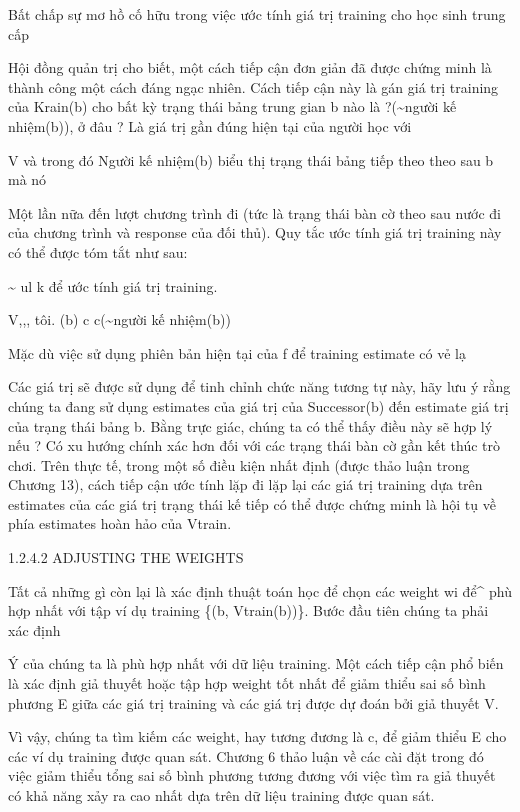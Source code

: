 Bất chấp sự mơ hồ cố hữu trong việc ước tính giá trị training cho học sinh trung cấp

Hội đồng quản trị cho biết, một cách tiếp cận đơn giản đã được chứng minh là thành công một cách đáng ngạc nhiên. Cách tiếp cận này là gán giá trị training của Krain(b) cho bất kỳ trạng thái bảng trung gian b nào là ?(\textasciitilde{}người kế nhiệm(b)), ở đâu ? Là giá trị gần đúng hiện tại của người học với

V và trong đó Người kế nhiệm(b) biểu thị trạng thái bảng tiếp theo theo sau b mà nó

Một lần nữa đến lượt chương trình đi (tức là trạng thái bàn cờ theo sau nước đi của chương trình và response của đối thủ). Quy tắc ước tính giá trị training này có thể được tóm tắt như sau:

\textasciitilde{} ul k để ước tính giá trị training.

V,,, tôi. (b) c c(\textasciitilde{}người kế nhiệm(b))

Mặc dù việc sử dụng phiên bản hiện tại của f để training estimate có vẻ lạ

Các giá trị sẽ được sử dụng để tinh chỉnh chức năng tương tự này, hãy lưu ý rằng chúng ta đang sử dụng estimates của giá trị của Successor(b) đến estimate giá trị của trạng thái bảng b. Bằng trực giác, chúng ta có thể thấy điều này sẽ hợp lý nếu ? Có xu hướng chính xác hơn đối với các trạng thái bàn cờ gần kết thúc trò chơi. Trên thực tế, trong một số điều kiện nhất định (được thảo luận trong Chương 13), cách tiếp cận ước tính lặp đi lặp lại các giá trị training dựa trên estimates của các giá trị trạng thái kế tiếp có thể được chứng minh là hội tụ về phía estimates hoàn hảo của Vtrain.

1.2.4.2 ADJUSTING THE WEIGHTS

Tất cả những gì còn lại là xác định thuật toán học để chọn các weight wi để\textasciicircum{} phù hợp nhất với tập ví dụ training \{(b, Vtrain(b))\}. Bước đầu tiên chúng ta phải xác định

Ý của chúng ta là phù hợp nhất với dữ liệu training. Một cách tiếp cận phổ biến là xác định giả thuyết hoặc tập hợp weight tốt nhất để giảm thiểu sai số bình phương E giữa các giá trị training và các giá trị được dự đoán bởi giả thuyết V.

Vì vậy, chúng ta tìm kiếm các weight, hay tương đương là c, để giảm thiểu E cho các ví dụ training được quan sát. Chương 6 thảo luận về các cài đặt trong đó việc giảm thiểu tổng sai số bình phương tương đương với việc tìm ra giả thuyết có khả năng xảy ra cao nhất dựa trên dữ liệu training được quan sát.

